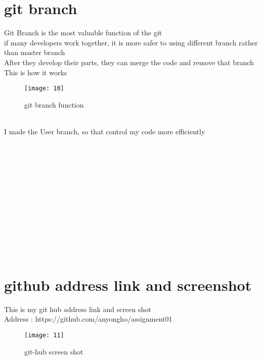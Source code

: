 \section{git branch}
Git Branch is the most valuable function of the git\\
if many developers work together, it is more safer to using different branch rather than master branch\\
After they develop their parts, they can merge the code and remove that branch\\
This is how it works\\ 
\begin{figure} [!h]
	\centering
	\texttt{[image: 10]}
	\caption{git branch function}
	\label{fig:10}
\end{figure}\\
I made the User branch, so that control my code more efficiently
\\\\\\\\\\\\\\\\\\\\\\\\\\
\section{github address link and screenshot}
This is my git hub address link and screen shot\\
Address : https://github.com/anyongho/assignment01\\
\begin{figure} [!h]
	\centering
	\texttt{[image: 11]}
	\caption{git-hub screen shot}
	\label{fig:11}
\end{figure}
